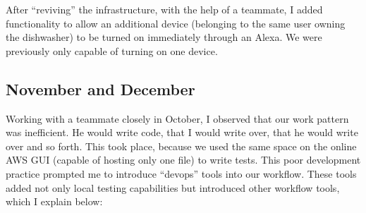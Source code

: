 \documentclass[a4paper]{article}
\begin{document}
After ``reviving'' the infrastructure, with the help of a teammate, I added functionality to allow an additional device (belonging to the same user owning the dishwasher) to be turned on immediately through an Alexa. We were previously only capable of turning on one device.

\subsection{November and December}
Working with a teammate closely in October, I observed that our work pattern was inefficient. He would write code, that I would write over, that he would write over and so forth. This took place, because we used the same space on the online AWS GUI (capable of hosting only one file) to write tests. This poor development practice prompted me to introduce ``devops'' tools into our workflow. These tools added not only local testing capabilities but introduced other workflow tools, which I explain below:
\end{document}
